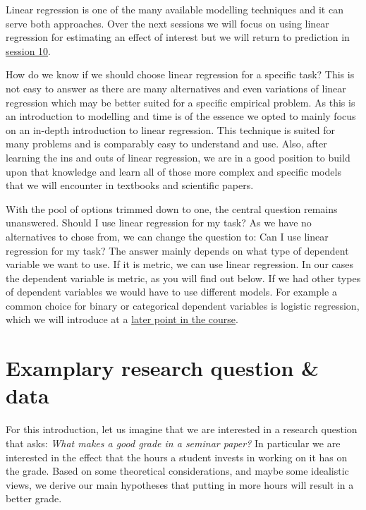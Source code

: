 \documentclass[
]{book}
\begin{document}
Linear regression is one of the many available modelling techniques and it can
serve both approaches. Over the next sessions we will focus on using
linear regression for estimating an effect of interest but we will return to
prediction in \protect\hyperlink{pm-t}{session 10}.

How do we know if we should choose linear regression for a specific task?
This is not easy to answer as there are many alternatives and even variations of
linear regression which may be better suited for a specific empirical problem.
As this is an introduction to modelling and time is of the essence we opted to
mainly focus on an in-depth introduction to linear regression.
This technique is suited for many problems and
is comparably easy to understand and use. Also, after learning the ins and outs
of linear regression, we are in a good position to build upon that knowledge and
learn all of those more complex and specific models that we will encounter in
textbooks and scientific papers.

With the pool of options trimmed down to one, the central question remains unanswered.
Should I use linear regression for my task? As we have no alternatives to chose
from, we can change the question to: Can I use linear regression for my task?
The answer mainly depends on what type of dependent variable we want to use.
If it is metric, we can use linear regression.
In our cases the dependent variable is metric, as you will find out below.
If we had other types of dependent variables we would have to use different
models.
For example a common choice for binary or categorical dependent variables is
logistic regression, which we will introduce at a \protect\hyperlink{log-est}{later point in the course}.

\hypertarget{examplary-research-question-data}{%
\section{Examplary research question \& data}\label{examplary-research-question-data}}

For this introduction, let us imagine that we are interested in a research
question that asks: \emph{What makes a good grade in a seminar paper?} In particular we
are interested in the effect that the hours a student invests in working on it
has on the grade. Based on some theoretical considerations, and maybe some
idealistic views, we derive our main hypotheses that putting in more hours will
result in a better grade.
\end{document}
